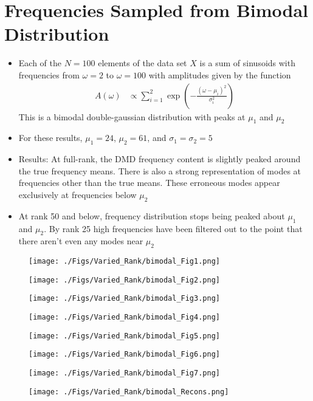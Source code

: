 \documentclass[11pt,reqno]{amsart}
\begin{document}
\newpage
\section{Frequencies Sampled from Bimodal Distribution}
\begin{itemize}
\item
Each of the $N=100$ elements of the data set $X$ is a sum of sinusoids with frequencies from $\omega = 2$ to $\omega=100$ with amplitudes given by the function
\begin{equation}
\begin{split}
A(\omega) &\propto \sum_{i=1}^2\exp\left(-\frac{(\omega-\mu_i)^2}{\sigma_i^2}\right)
\end{split}
\end{equation}
This is a bimodal double-gaussian distribution with peaks at $\mu_1$ and $\mu_2$
\item
For these results, $\mu_1 = 24$, $\mu_2 = 61$, and $\sigma_1=\sigma_2=5$
\item
Results: At full-rank, the DMD frequency content is slightly peaked around the true frequency means. There is also a strong representation of modes at frequencies other than the true means. These erroneous modes appear exclusively at frequencies below $\mu_2$
\item
At rank 50 and below, frequency distribution stops being peaked about $\mu_1$ and $\mu_2$. By rank 25 high frequencies have been filtered out to the point that there aren't even any modes near $\mu_2$
\end{itemize}

\begin{figure}[htb!]
\texttt{[image: ./Figs/Varied\_Rank/bimodal\_Fig1.png]}
\end{figure}
\begin{figure}[htb!]
\texttt{[image: ./Figs/Varied\_Rank/bimodal\_Fig2.png]}
\end{figure}
\begin{figure}[htb!]
\texttt{[image: ./Figs/Varied\_Rank/bimodal\_Fig3.png]}
\end{figure}
\begin{figure}[htb!]
\texttt{[image: ./Figs/Varied\_Rank/bimodal\_Fig4.png]}
\end{figure}
\begin{figure}[htb!]
\texttt{[image: ./Figs/Varied\_Rank/bimodal\_Fig5.png]}
\end{figure}
\begin{figure}[htb!]
\texttt{[image: ./Figs/Varied\_Rank/bimodal\_Fig6.png]}
\end{figure}
\begin{figure}[htb!]
\texttt{[image: ./Figs/Varied\_Rank/bimodal\_Fig7.png]}
\end{figure}
\begin{figure}[htb!]
\texttt{[image: ./Figs/Varied\_Rank/bimodal\_Recons.png]}
\end{figure}
\end{document}
